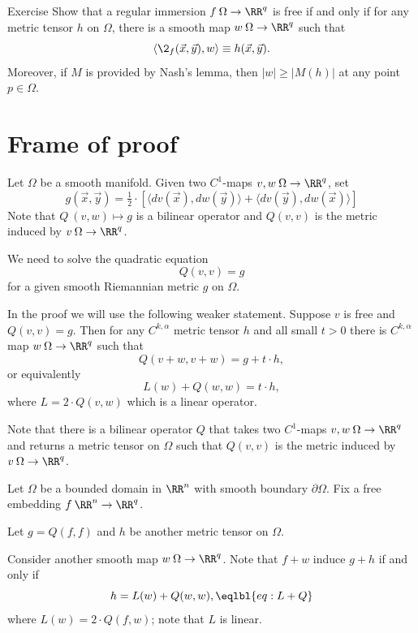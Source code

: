 \begin{thm}{Exercise}
Show that a regular immersion $f\:\Omega\to\RR^q$ is free if and only if for any metric tensor $h$ on $\Omega$, there is a smooth map $w\:\Omega\to \RR^q$ such that 
\[\langle \2_f(\vec x,\vec y),w\rangle\equiv h(\vec x,\vec y).\]
Moreover, if $M$ is provided by Nash's lemma, then $|w|\ge |M(h)|$ at any point $p\in\Omega$.  
\end{thm}

















\section{Frame of proof}

Let $\Omega$ be a smooth manifold.
Given two $C^1$-maps $v,w\:\Omega \to\RR^q$, set 
\[g(\vec x,\vec y)=\tfrac12\cdot[\langle d v(\vec x),dw(\vec y)\rangle+\langle d v(\vec y),dw(\vec x)\rangle]\]
Note that $Q\:(v,w)\mapsto g$ is a bilinear operator and $Q(v,v)$ is the metric induced by $v\:\Omega \to\RR^q$.

We need to solve the quadratic equation
\[Q(v,v)=g\]
for a given smooth Riemannian metric $g$ on $\Omega$.





In the proof we will use the following weaker statement.
Suppose $v$ is free and $Q(v,v)=g$.
Then for any $C^{k,\alpha}$ metric tensor $h$ and all small $t>0$ there is $C^{k,\alpha}$ map 
$w\:\Omega \to \RR^q$ such that
\[Q(v+w,v+w)=g+t\cdot h,\]
or equivalently
\[L(w)+Q(w,w)=t\cdot h,\]
where $L=2\cdot Q(v,w)$ which is a linear operator.



Note that there is a bilinear operator $Q$ that takes two $C^1$-maps $v,w\:\Omega \to\RR^q$ and returns a metric tensor on $\Omega$ such that $Q(v,v)$ is the metric induced by $v\:\Omega \to\RR^q$.


Let $\Omega$ be a bounded domain in $\RR^n$ with smooth boundary $\partial\Omega$.
Fix a free embedding $f\:\RR^n\to\RR^q$.

Let $g=Q(f,f)$ and $h$ be another metric tensor on $\Omega$.

Consider another smooth map $w\:\Omega\to \RR^q$.
Note that $f+w$ induce $g+h$ if and only if
\[h=L(w)+Q(w,w),\eqlbl{eq:L+Q}\]
where $L(w)=2\cdot Q(f,w)$;
note that $L$ is linear.

